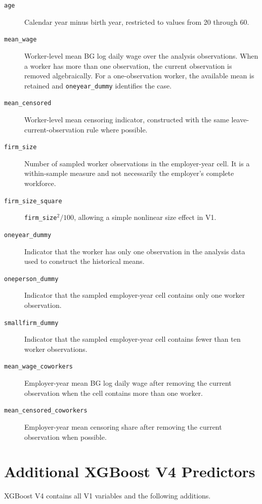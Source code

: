 \documentclass[12pt,a4paper,oneside,titlepage]{book}
\begin{document}
\begin{description}
  \item[\texttt{age}] Calendar year minus birth year, restricted to values from 20 through 60.
  \item[\texttt{mean\_wage}] Worker-level mean BG log daily wage over the analysis observations. When a worker has more than one observation, the current observation is removed algebraically. For a one-observation worker, the available mean is retained and \texttt{oneyear\_dummy} identifies the case.
  \item[\texttt{mean\_censored}] Worker-level mean censoring indicator, constructed with the same leave-current-observation rule where possible.
  \item[\texttt{firm\_size}] Number of sampled worker observations in the employer-year cell. It is a within-sample measure and not necessarily the employer's complete workforce.
  \item[\texttt{firm\_size\_square}] \texttt{firm\_size}$^2/100$, allowing a simple nonlinear size effect in V1.
  \item[\texttt{oneyear\_dummy}] Indicator that the worker has only one observation in the analysis data used to construct the historical means.
  \item[\texttt{oneperson\_dummy}] Indicator that the sampled employer-year cell contains only one worker observation.
  \item[\texttt{smallfirm\_dummy}] Indicator that the sampled employer-year cell contains fewer than ten worker observations.
  \item[\texttt{mean\_wage\_coworkers}] Employer-year mean BG log daily wage after removing the current observation when the cell contains more than one worker.
  \item[\texttt{mean\_censored\_coworkers}] Employer-year mean censoring share after removing the current observation when possible.
\end{description}

\section{Additional XGBoost V4 Predictors}

XGBoost V4 contains all V1 variables and the following additions.
\end{document}
